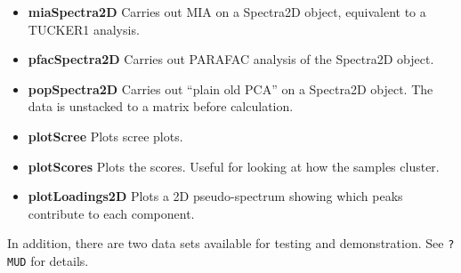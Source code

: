 \documentclass[10pt,twocolumn,twoside,]{pinp}
\providecommand{\tightlist}{%
  \setlength{\itemsep}{0pt}\setlength{\parskip}{0pt}}
\begin{document}
\begin{itemize}
  \begin{itemize}
  \tightlist
  \item
    \textbf{miaSpectra2D} Carries out MIA on a Spectra2D object,
    equivalent to a TUCKER1 analysis.
  \item
    \textbf{pfacSpectra2D} Carries out PARAFAC analysis of the Spectra2D
    object.
  \item
    \textbf{popSpectra2D} Carries out ``plain old PCA'' on a Spectra2D
    object. The data is unstacked to a matrix before calculation.
  \item
    \textbf{plotScree} Plots scree plots.
  \item
    \textbf{plotScores} Plots the scores. Useful for looking at how the
    samples cluster.
  \item
    \textbf{plotLoadings2D} Plots a 2D pseudo-spectrum showing which
    peaks contribute to each component.
  \end{itemize}
\end{itemize}

In addition, there are two data sets available for testing and
demonstration. See \texttt{?MUD} for details.

\renewcommand{\pnasbreak}{\begin{strip}\vskip0pt\end{strip}}

\phantom{xxx}

\showacknow

\pnasbreak 



\end{document}
